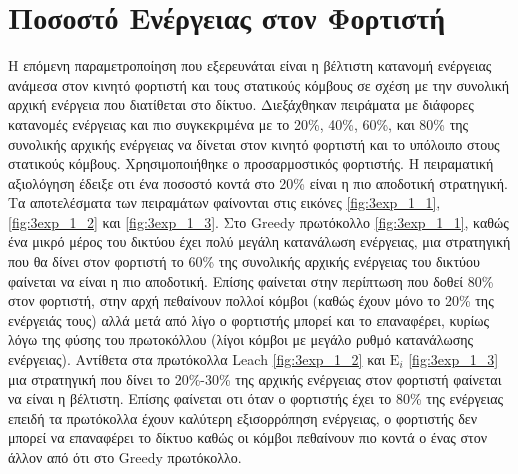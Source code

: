 \section{Ποσοστό Ενέργειας στον Φορτιστή}\label{sc:result3}
H επόμενη παραμετροποίηση που εξερευνάται είναι η βέλτιστη κατανομή ενέργειας ανάμεσα στον κινητό φορτιστή και τους στατικούς κόμβους σε σχέση με την συνολική αρχική
ενέργεια που διατίθεται στο δίκτυο. Διεξάχθηκαν πειράματα με διάφορες κατανομές ενέργειας και πιο συγκεκριμένα με το 20\%, 40\%, 60\%, και 80\% της συνολικής αρχικής
ενέργειας να δίνεται στον κινητό φορτιστή και το υπόλοιπο στους στατικούς κόμβους. Χρησιμοποιήθηκε ο προσαρμοστικός φορτιστής. Η πειραματική αξιολόγηση έδειξε οτι ένα
ποσοστό κοντά στο 20\% είναι η πιο αποδοτική στρατηγική. Τα αποτελέσματα των πειραμάτων φαίνονται στις εικόνες \ref{fig:3exp_1_1}, \ref{fig:3exp_1_2} και
\ref{fig:3exp_1_3}. Στο Greedy πρωτόκολλο \ref{fig:3exp_1_1}, καθώς ένα μικρό μέρος του δικτύου έχει πολύ μεγάλη κατανάλωση ενέργειας, μια στρατηγική που θα δίνει
στον φορτιστή το 60\% της συνολικής αρχικής ενέργειας του δικτύου φαίνεται να είναι η πιο αποδοτική. Επίσης φαίνεται στην περίπτωση που δοθεί 80\% στον φορτιστή, στην
αρχή πεθαίνουν πολλοί κόμβοι (καθώς έχουν μόνο το 20\% της ενέργειάς τους) αλλά μετά από λίγο ο φορτιστής μπορεί και το επαναφέρει, κυρίως λόγω της φύσης του
πρωτοκόλλου (λίγοι κόμβοι με μεγάλο ρυθμό κατανάλωσης ενέργειας). Αντίθετα στα πρωτόκολλα Leach \ref{fig:3exp_1_2} και $\text{E}_{i}$ \ref{fig:3exp_1_3} μια
στρατηγική που δίνει το 20\%-30\% της αρχικής ενέργειας στον φορτιστή φαίνεται να είναι η βέλτιστη. Επίσης φαίνεται οτι όταν ο φορτιστής έχει το 80\% της ενέργειας
επειδή τα πρωτόκολλα έχουν καλύτερη εξισορρόπηση ενέργειας, ο φορτιστής δεν μπορεί να επαναφέρει το δίκτυο καθώς οι κόμβοι πεθαίνουν πιο κοντά ο ένας στον άλλον από
ότι στο Greedy πρωτόκολλο.



